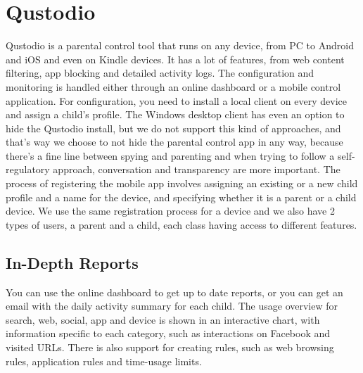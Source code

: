 \section{Qustodio}

Qustodio is a parental control tool that runs on any device, from PC to Android and iOS and even on Kindle devices. It has a lot of features, from web content filtering, app blocking and detailed activity logs. The configuration and monitoring is handled either through an online dashboard or a mobile control application. For configuration, you need to install a local client on every device and assign a child's profile. The Windows desktop client has even an option to hide the Qustodio install, but we do not support this kind of approaches, and that's way we choose to not hide the parental control app in any way, because there's a fine line between spying and parenting and when trying to follow a self-regulatory approach, conversation and transparency are more important. The process of registering the mobile app involves assigning an existing or a new child profile and a name for the device, and specifying whether it is a parent or a child device. We use the same registration process for a device and we also have 2 types of users, a parent and a child, each class having access to different features. \parencite{qustodioPCMag}

\subsection{In-Depth Reports}

You can use the online dashboard to get up to date reports, or you can get an email with the daily activity summary for each child. The usage overview for search, web, social, app and device is shown in an interactive chart, with information specific to each category, such as interactions on Facebook and visited URLs. There is also support for creating rules, such as web browsing rules, application rules and time-usage limits.

